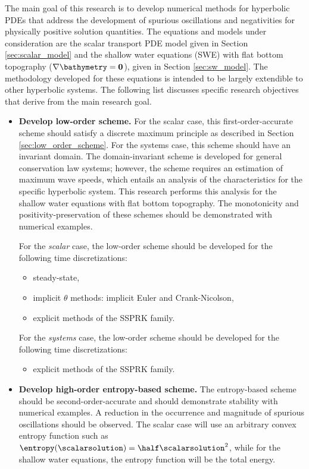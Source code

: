 The main goal of this research is to develop numerical methods for hyperbolic
PDEs that address the development of spurious oscillations and negativities for
physically positive solution quantities. The equations and models under
consideration are the scalar transport PDE model given in Section
\ref{sec:scalar_model} and the shallow water equations (SWE) with flat bottom
topography ($\nabla\bathymetry=\mathbf{0}$), given in Section
\ref{sec:sw_model}.  The methodology developed for these equations is intended
to be largely extendible to other hyperbolic systems. The following list
discusses specific research objectives that derive from the main research goal.

\begin{itemize}
  \item \textbf{Develop low-order scheme.}
    For the scalar case, this first-order-accurate scheme should satisfy a discrete maximum principle
    as described in Section \ref{sec:low_order_scheme}. For the systems case,
    this scheme should have an invariant domain. The domain-invariant scheme
    is developed for general conservation law systems; however, the scheme
    requires an estimation of maximum wave speeds, which entails an
    analysis of the characteristics for the specific hyperbolic system. This
    research performs this analysis for the shallow water equations with flat
    bottom topography. The monotonicity and
    positivity-preservation of these schemes should be demonstrated with
    numerical examples.

    For the \emph{scalar} case, the low-order scheme should be
    developed for the following time discretizations:
    \begin{itemize}
      \item steady-state,
      \item implicit $\theta$ methods: implicit Euler and Crank-Nicolson,
      \item explicit methods of the SSPRK family.
    \end{itemize}
    For the \emph{systems} case, the low-order scheme should be
    developed for the following time discretizations:
    \begin{itemize}
      \item explicit methods of the SSPRK family.
    \end{itemize}
  \item \textbf{Develop high-order entropy-based scheme.}
    The entropy-based scheme should be second-order-accurate and should
    demonstrate stability with numerical examples. A reduction in the occurrence
    and magnitude of spurious oscillations should be observed. The scalar
    case will use an arbitrary convex entropy function such as
    $\entropy(\scalarsolution)=\half\scalarsolution^2$, while for the shallow
    water equations, the entropy function will be the total energy.


\end{itemize}
